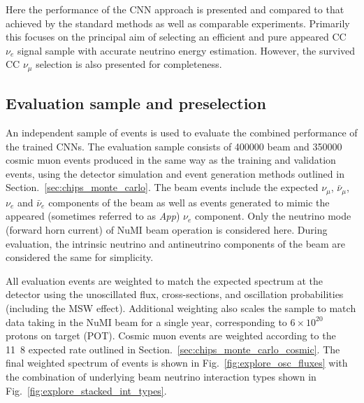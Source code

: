 Here the performance of the CNN approach is presented and compared to that achieved by the
standard \chips methods as well as comparable experiments. Primarily this focuses on the principal
aim of selecting an efficient and pure appeared CC $\nu_{e}$ signal sample with accurate neutrino
energy estimation. However, the survived CC $\nu_{\mu}$ selection is also presented for
completeness.

\subsection{Evaluation sample and preselection} %
\label{sec:results_eval_sample} %

An independent sample of events is used to evaluate the combined performance of the trained CNNs.
The evaluation sample consists of 400000 beam and 350000 cosmic muon events produced in the same
way as the training and validation events, using the detector simulation and event generation
methods outlined in Section.~\ref{sec:chips_monte_carlo}. The beam events include the expected
$\nu_{\mu}$, $\bar{\nu}_{\mu}$, $\nu_{e}$ and $\bar{\nu}_{e}$ components of the beam as well as
events generated to mimic the appeared (sometimes referred to as \emph{App}) $\nu_{e}$ component.
Only the neutrino mode (forward horn current) of NuMI beam operation is considered here. During
evaluation, the intrinsic neutrino and antineutrino components of the beam are considered the same
for simplicity.

All evaluation events are weighted to match the expected spectrum at the \chipsfive detector using
the unoscillated flux, cross-sections, and oscillation probabilities (including the MSW effect).
Additional weighting also scales the sample to match data taking in the NuMI beam for a single
year, corresponding to $6\times 10^{20}$ protons on target (POT). Cosmic muon events are weighted
according to the \unit{11.8}{} expected \chipsfive rate outlined in
Section.~\ref{sec:chips_monte_carlo_cosmic}. The final weighted spectrum of events is shown in
Fig.~\ref{fig:explore_osc_fluxes} with the combination of underlying beam neutrino interaction
types shown in Fig.~\ref{fig:explore_stacked_int_types}.

